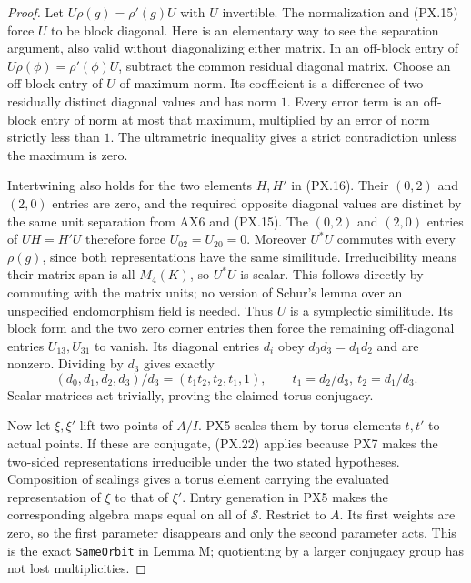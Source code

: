 \begin{proof}
Let $U\rho(g)=\rho'(g)U$ with $U$ invertible.
The normalization and (PX.15) force $U$
to be block diagonal.  Here is an elementary
way to see the separation argument, also
valid without diagonalizing either matrix.
In an off-block entry of
$U\rho(\phi)=\rho'(\phi)U$, subtract the
common residual diagonal matrix.  Choose
an off-block entry of $U$ of maximum norm.
Its coefficient is a difference of two
residually distinct diagonal values and
has norm $1$.  Every error term is an
off-block entry of norm at most that
maximum, multiplied by an error of
norm strictly less than $1$.
The ultrametric inequality gives a
strict contradiction unless the maximum
is zero.

Intertwining also holds for the two
elements $H,H'$ in (PX.16).  Their
$(0,2)$ and $(2,0)$ entries are zero,
and the required opposite diagonal
values are distinct by the same
unit separation from AX6 and (PX.15).
The $(0,2)$ and $(2,0)$ entries of
$UH=H'U$ therefore force
$U_{02}=U_{20}=0$.
Moreover $U^*U$ commutes with every
$\rho(g)$, since both representations
have the same similitude.  Irreducibility
means their matrix span is all $M_4(K)$,
so $U^*U$ is scalar.  This follows
directly by commuting with the matrix
units; no version of Schur's lemma
over an unspecified endomorphism
field is needed.  Thus $U$ is a
symplectic similitude.  Its block
form and the two zero corner entries
then force the remaining off-diagonal
entries $U_{13},U_{31}$ to vanish.
Its diagonal entries $d_i$ obey
$d_0d_3=d_1d_2$ and are nonzero.
Dividing by $d_3$ gives exactly
\[
       (d_0,d_1,d_2,d_3)/d_3
             =(t_1t_2,t_2,t_1,1),
 \qquad t_1=d_2/d_3,\ t_2=d_1/d_3.
 \tag{PX.22}
\]
Scalar matrices act trivially, proving
the claimed torus conjugacy.

Now let $\xi,\xi'$ lift two points of
$A/I$.  PX5 scales them by torus
elements $t,t'$ to actual points.
If these are conjugate, (PX.22)
applies because PX7 makes the two-sided
representations irreducible under the
two stated hypotheses.  Composition of scalings gives a
torus element carrying the evaluated
representation of $\xi$ to that
of $\xi'$.  Entry generation in
PX5 makes the corresponding algebra
maps equal on all of $\mathcal S$.
Restrict to $A$.  Its first weights
are zero, so the first parameter
disappears and only the second
parameter acts.  This is the exact
\texttt{SameOrbit} in Lemma M;
quotienting by a larger conjugacy
group has not lost multiplicities.
\end{proof}

